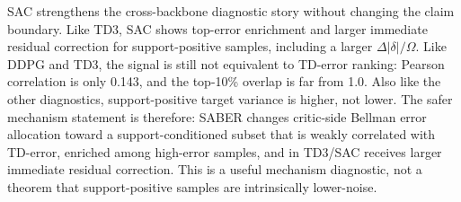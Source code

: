 \documentclass[letterpaper]{article}
\begin{document}
SAC strengthens the cross-backbone diagnostic story without changing the claim boundary. Like TD3, SAC shows top-error enrichment and larger immediate residual correction for support-positive samples, including a larger \(\Delta|\delta|/\Omega\). Like DDPG and TD3, the signal is still not equivalent to TD-error ranking: Pearson correlation is only 0.143, and the top-10\% overlap is far from 1.0. Also like the other diagnostics, support-positive target variance is higher, not lower. The safer mechanism statement is therefore: SABER changes critic-side Bellman error allocation toward a support-conditioned subset that is weakly correlated with TD-error, enriched among high-error samples, and in TD3/SAC receives larger immediate residual correction. This is a useful mechanism diagnostic, not a theorem that support-positive samples are intrinsically lower-noise.
\end{document}
